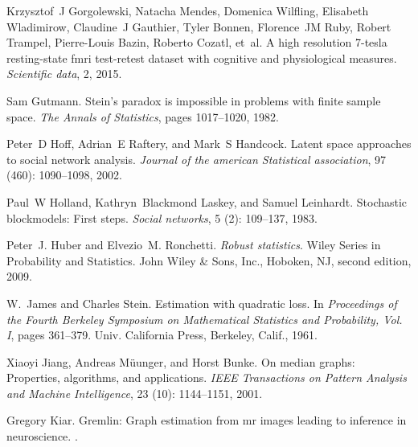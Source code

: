 \documentclass[10pt,letterpaper]{article}
\begin{document}
\begin{thebibliography}{10}
Krzysztof~J Gorgolewski, Natacha Mendes, Domenica Wilfling, Elisabeth
  Wladimirow, Claudine~J Gauthier, Tyler Bonnen, Florence~JM Ruby, Robert
  Trampel, Pierre-Louis Bazin, Roberto Cozatl, et~al.
\newblock A high resolution 7-tesla resting-state fmri test-retest dataset with
  cognitive and physiological measures.
\newblock \emph{Scientific data}, 2, 2015.

Sam Gutmann.
\newblock Stein's paradox is impossible in problems with finite sample space.
\newblock \emph{The Annals of Statistics}, pages 1017--1020, 1982.

Peter~D Hoff, Adrian~E Raftery, and Mark~S Handcock.
\newblock Latent space approaches to social network analysis.
\newblock \emph{Journal of the american Statistical association}, 97
  (460): 1090--1098, 2002.

Paul~W Holland, Kathryn~Blackmond Laskey, and Samuel Leinhardt.
\newblock Stochastic blockmodels: First steps.
\newblock \emph{Social networks}, 5 (2): 109--137, 1983.

Peter~J. Huber and Elvezio~M. Ronchetti.
\newblock \emph{Robust statistics}.
\newblock Wiley Series in Probability and Statistics. John Wiley \& Sons, Inc.,
  Hoboken, NJ, second edition, 2009.

W.~James and Charles Stein.
\newblock Estimation with quadratic loss.
\newblock In \emph{Proceedings of the {F}ourth {B}erkeley {S}ymposium on
  {M}athematical {S}tatistics and {P}robability, {V}ol. {I}}, pages 361--379.
  Univ. California Press, Berkeley, Calif., 1961.

Xiaoyi Jiang, Andreas M{\"u}unger, and Horst Bunke.
\newblock On median graphs: Properties, algorithms, and applications.
\newblock \emph{IEEE Transactions on Pattern Analysis and Machine
  Intelligence}, 23 (10): 1144--1151, 2001.

Gregory Kiar.
\newblock Gremlin: Graph estimation from mr images leading to inference in
  neuroscience.
.


\end{thebibliography}
\end{document}

